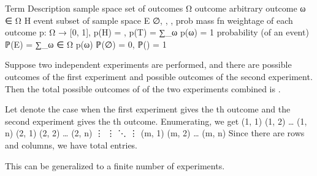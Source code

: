 \startchapter [title={Discrete Probability Spaces}]

	\setuptabulate [
		split=yes,
		header=text,
		frame=on,
		title={\tfa Notations}]

	\starttabulate [|l|l|M|m|]
		\FL
		\NC  Term  \NC  Description  \NC  {}  \NC  {}  \NR
		\FL
		\NC  sample space  \NC  set of outcomes  \NC  Ω  \NC  \bcrl[H, T]  \NR \TB[halfline]
		\NC  outcome  \NC  arbitrary outcome  \NC  ω ∈ Ω  \NC  H  \NR \TB[halfline]
		\NC  event  \NC  subset of sample space  \NC  E  \NC  ∅, \bcrl[H], \bcrl[T], \bcrl[H, T]  \NR \TB[halfline]
		\NC  prob mass fn  \NC  weightage of each outcome  \NC  p: Ω → [0, 1],   \NC  p(H) = , p(T) =   \NR
		\NC  \NC  \NC  ∑_ω p(ω) = 1  \NC  \NR \TB[halfline]
		\NC  probability  \NC  (of an event)  \NC  ℙ(E) = ∑_{ω ∈ Ω} p(ω)  \NC  ℙ(∅) = 0, ℙ(\bcrl[H, T]) = 1  \NR \TB[halfline]
		\BL
	\stoptabulate

	\startproposition[title={Basic principle of counting}]
		Suppose two independent experiments are performed, and there are  possible outcomes of the first experiment and  possible outcomes of the second experiment. Then the total possible outcomes of of the two experiments combined is .
	\stopproposition
	
	\startproof
		Let  denote the case when the first experiment gives the th outcome and the second experiment gives the th outcome. Enumerating, we get
		\startformula  \startmatrix[n=4]
			\NC  (1, 1)  \NC  (1, 2)  \NC  …  \NC  (1, n)  \NR
			\NC  (2, 1)  \NC  (2, 2)  \NC  …  \NC  (2, n)  \NR
			\NC  ⋮       \NC  ⋮       \NC  ⋱  \NC  ⋮       \NR
			\NC  (m, 1)  \NC  (m, 2)  \NC  …  \NC  (m, n)  \NR
		\stopmatrix	 \stopformula
		Since there are  rows and  columns, we have total  entries.
	\stopproof

	\startremark
		This can be generalized to a finite number of experiments.
	\stopremark


\stopchapter
